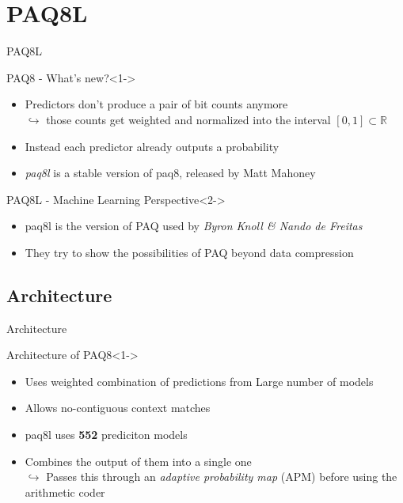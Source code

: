 \documentclass[11pt,usenames,dvipsnames]{beamer}
\begin{document}
\section{PAQ8L}
\begin{frame}{PAQ8L}
	\begin{exampleblock}{PAQ8 - What's new?}<1->
		\begin{itemize}
			\item Predictors don't produce a pair of bit counts anymore\\
			$\hookrightarrow$ those counts get weighted and normalized into the interval $[0,1]\subset\mathbb{R}$
			\item Instead  each predictor already outputs a probability
			\item \textit{paq8l} is a stable version of paq8, released by Matt Mahoney
		\end{itemize}
	\end{exampleblock}
	
		\begin{alertblock}{PAQ8L - Machine Learning Perspective}<2->
		\begin{itemize}
			\item paq8l is the version of PAQ used by \textit{Byron Knoll \& Nando de Freitas}
			\item They try to show the possibilities of PAQ beyond data compression
		\end{itemize}
	\end{alertblock}
\end{frame}

\subsection{Architecture}
\begin{frame}{Architecture}


	\begin{exampleblock}{Architecture of PAQ8}<1->
		\begin{itemize}
			\item Uses weighted combination of predictions from Large number of models
			\item Allows no-contiguous context matches
			\item paq8l uses \textbf{552} prediciton models
			\item Combines the output of them into a single one\\
			$\hookrightarrow$ Passes this through an \textit{adaptive probability map} (APM) before using the arithmetic coder
		\end{itemize}
	\end{exampleblock}

\end{frame}
\end{document}
